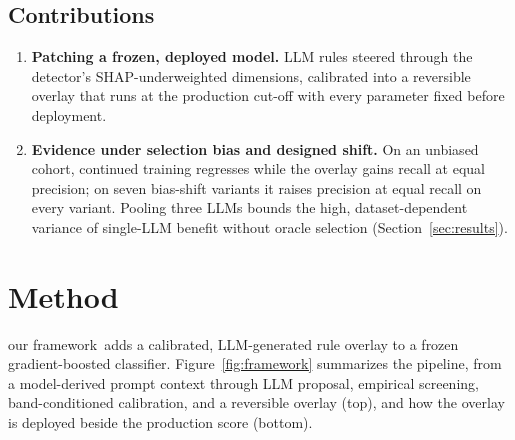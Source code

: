 \documentclass[11pt]{article}
\newcommand{\sysname}{our framework}
\begin{document}
\subsection*{Contributions}

\begin{enumerate}[nosep,leftmargin=1.2em]
  \item \textbf{Patching a frozen, deployed model.} LLM rules steered through the detector's
    SHAP-underweighted dimensions, calibrated into a reversible overlay that runs at the production
    cut-off with every parameter fixed before deployment.
  \item \textbf{Evidence under selection bias and designed shift.} On an unbiased cohort, continued
    training regresses while the overlay gains recall at equal precision; on seven bias-shift
    variants it raises precision at equal recall on every variant. Pooling three LLMs bounds the high,
    dataset-dependent variance of single-LLM benefit without oracle selection
    (Section~\ref{sec:results}).
\end{enumerate}

\section{Method}
\label{sec:method}

\sysname\ adds a calibrated, LLM-generated rule overlay to a frozen gradient-boosted classifier.
Figure~\ref{fig:framework} summarizes the pipeline, from a model-derived prompt context through
LLM proposal, empirical screening, band-conditioned calibration, and a reversible overlay (top),
and how the overlay is deployed beside the production score (bottom).

\end{document}
